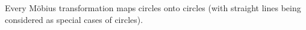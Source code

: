 Every Möbius transformation maps circles onto circles (with straight lines being considered as special cases of circles).
